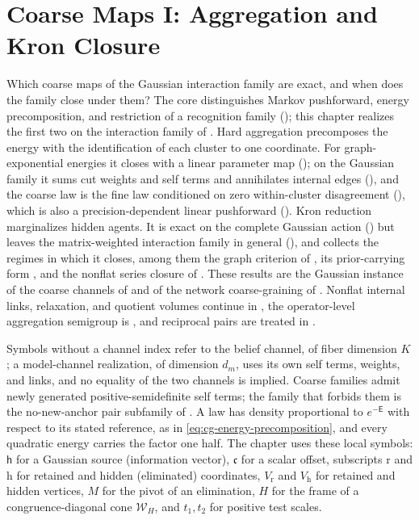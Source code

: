 \chapter{Coarse Maps I: Aggregation and Kron Closure}
\label{ch:gaussian-coarsegraining}

Which coarse maps of the Gaussian interaction family are exact, and when does
the family close under them? The core distinguishes Markov pushforward, energy
precomposition, and restriction of a recognition family
(); this chapter realizes the first two on the
interaction family of . Hard aggregation
precomposes the energy with the identification of each cluster to one
coordinate. For graph-exponential energies it closes with a linear parameter
map (); on the Gaussian family it sums
cut weights and self terms and annihilates internal edges
(), and the coarse law is the fine law
conditioned on zero within-cluster disagreement
(), which is also a precision-dependent
linear pushforward (). Kron reduction
marginalizes hidden agents. It is exact on the complete Gaussian action
() but leaves the matrix-weighted
interaction family in general (), and
 collects the regimes in which it closes, among them
the graph criterion of , its
prior-carrying form , and the nonflat series
closure of . These results are the Gaussian
instance of the coarse channels of  and of the network
coarse-graining of . Nonflat internal links,
relaxation, and quotient volumes continue in , the
operator-level aggregation semigroup is ,
and reciprocal pairs are treated in .

Symbols without a channel index refer to the belief channel, of fiber
dimension \(K\); a model-channel realization, of dimension \(d_m\), uses its own
self terms, weights, and links, and no equality of the two channels is implied.
Coarse families admit newly generated positive-semidefinite self terms; the
family that forbids them is the no-new-anchor pair subfamily of
. A law has density proportional to
\(e^{-\mathsf E}\) with respect to its stated reference, as in
\eqref{eq:cg-energy-precomposition}, and every quadratic energy carries the
factor one half. The chapter uses these local symbols: \(\mathsf h\) for a
Gaussian source (information vector), \(\mathfrak c\) for a scalar offset,
subscripts \(\mathrm r\) and \(\mathrm h\) for retained and hidden (eliminated)
coordinates, \(V_{\mathrm r}\) and \(V_{\mathrm h}\) for retained and hidden
vertices, \(M\) for the pivot of an elimination, \(H\) for the frame of a
congruence-diagonal cone \(\mathcal W_H\), and \(t_1,t_2\) for positive test
scales.

